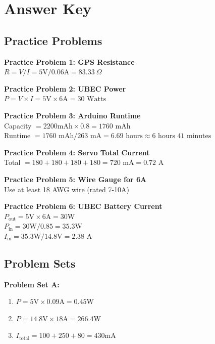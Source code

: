 \documentclass[11pt,letterpaper]{article}
\begin{document}
\section{Answer Key}

\subsection{Practice Problems}

\textbf{Practice Problem 1: GPS Resistance}\\
$R = V / I = 5\text{V} / 0.06\text{A} = 83.33~\Omega$

\textbf{Practice Problem 2: UBEC Power}\\
$P = V \times I = 5\text{V} \times 6\text{A} = 30\text{ Watts}$

\textbf{Practice Problem 3: Arduino Runtime}\\
Capacity $= 2200\text{mAh} \times 0.8 = 1760\text{ mAh}$\\
Runtime $= 1760\text{ mAh} / 263\text{ mA} = 6.69\text{ hours} \approx 6\text{ hours } 41\text{ minutes}$

\textbf{Practice Problem 4: Servo Total Current}\\
Total $= 180 + 180 + 180 + 180 = 720\text{ mA} = 0.72\text{ A}$

\textbf{Practice Problem 5: Wire Gauge for 6A}\\
Use at least 18 AWG wire (rated 7-10A)

\textbf{Practice Problem 6: UBEC Battery Current}\\
$P_{\text{out}} = 5\text{V} \times 6\text{A} = 30\text{W}$\\
$P_{\text{in}} = 30\text{W} / 0.85 = 35.3\text{W}$\\
$I_{\text{in}} = 35.3\text{W} / 14.8\text{V} = 2.38\text{ A}$

\subsection{Problem Sets}

\textbf{Problem Set A:}
\begin{enumerate}
  \item $P = 5\text{V} \times 0.09\text{A} = 0.45\text{W}$
  \item $P = 14.8\text{V} \times 18\text{A} = 266.4\text{W}$
  \item $I_{\text{total}} = 100 + 250 + 80 = 430\text{mA}$
\end{enumerate}
\end{document}
